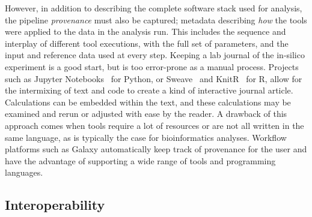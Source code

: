 \begin{justify}
However, in addition to describing the complete software stack used for analysis, the pipeline \emph{provenance} must also be captured; metadata describing \emph{how} the tools were applied to the data in the analysis run. This includes the sequence and interplay of different tool executions, with the full set of parameters, and the input and reference data used at every step. Keeping a lab journal of the in-silico experiment is a good start, but is too error-prone as a manual process. Projects such as Jupyter Notebooks~\cite{kluyver2016jupyter} for Python, or Sweave~\cite{leisch2002sweave} and KnitR~\cite{xie2014knitr} for R, allow for the intermixing of text and code to create a kind of interactive journal article. Calculations can be embedded within the text, and these calculations may be examined and rerun or adjusted with ease by the reader. A drawback of this approach comes when tools require a lot of resources or are not all written in the same language, as is typically the case for bioinformatics analyses. Workflow platforms such as Galaxy automatically keep track of provenance for the user and have the advantage of supporting a wide range of tools and programming languages.

\subsection{Interoperability}


\end{justify}
